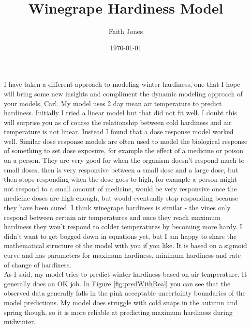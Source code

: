 \documentclass[11pt,letter]{article}
\title{Winegrape Hardiness Model}
\date{\today}
\author{Faith Jones}
\begin{document}
\renewcommand{\bibname}{References}%


\maketitle{}



I have taken a different approach to modeling winter hardiness, one that I hope will bring some new insights and compliment the dynamic modeling approach of your models, Carl. My model uses 2  day mean air temperature to predict hardiness. Initially I tried a linear model but that did not fit well. I doubt this will surprise you as of course the relationship between cold hardiness and air temperature is not linear. Instead I found that a dose response model worked well. Similar dose response models are often used to model the biological response of something to set dose exposure, for example the effect of a medicine or poison on a person. They are very good for when the organism doesn't respond much to small doses, then is very responsive between a small dose and a large dose, but then stops responding when the dose goes to high, for example a person might not respond to a small amount of medicine, would be very responsive once the medicine doses are high enough, but would eventually stop responding because they have been cured. I think winegrape hardiness is similar - the vines only respond between certain air temperatures and once they reach maximum hardiness they won't respond to colder temperatures by becoming more hardy. I didn't want to get bogged down in equations yet, but I am happy to share the mathematical structure of the model with you if you like. It is based on a sigmoid curve and has parameters for maximum hardiness, minimum hardiness and rate of change of hardiness. \\

As I said, my model tries to predict winter hardiness based on air temperature. It generally does an OK job. In Figure \ref{fig:predWithReal} you can see that the observed data generally falls in the pink acceptable uncertainty boundaries of the model predictions. My model does struggle with cold snaps in the autumn and spring though, so it is more reliable at predicting maximum hardiness during midwinter.     \\
\end{document}
